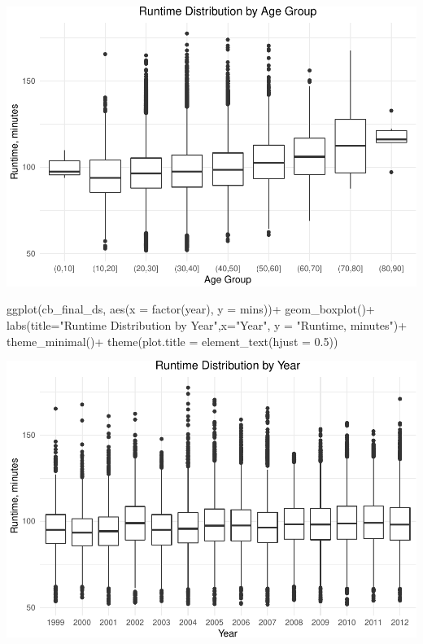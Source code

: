 \documentclass[
]{article}
\newenvironment{Shaded}{\begin{snugshade}}{\end{snugshade}}
\newcommand{\AttributeTok}[1]{\textcolor[rgb]{0.77,0.63,0.00}{#1}}
\newcommand{\FloatTok}[1]{\textcolor[rgb]{0.00,0.00,0.81}{#1}}
\newcommand{\FunctionTok}[1]{\textcolor[rgb]{0.00,0.00,0.00}{#1}}
\newcommand{\NormalTok}[1]{#1}
\newcommand{\SpecialCharTok}[1]{\textcolor[rgb]{0.00,0.00,0.00}{#1}}
\newcommand{\StringTok}[1]{\textcolor[rgb]{0.31,0.60,0.02}{#1}}
\begin{document}
\includegraphics{case_study02_SO02_files/figure-latex/analysis16-1}

\begin{Shaded}
\begin{Highlighting}[]
\FunctionTok{ggplot}\NormalTok{(cb\_final\_ds, }\FunctionTok{aes}\NormalTok{(}\AttributeTok{x =} \FunctionTok{factor}\NormalTok{(year), }\AttributeTok{y =}\NormalTok{ mins))}\SpecialCharTok{+}
  \FunctionTok{geom\_boxplot}\NormalTok{()}\SpecialCharTok{+}
  \FunctionTok{labs}\NormalTok{(}\AttributeTok{title=}\StringTok{"Runtime Distribution by Year"}\NormalTok{,}\AttributeTok{x=}\StringTok{"Year"}\NormalTok{, }\AttributeTok{y =} \StringTok{"Runtime, minutes"}\NormalTok{)}\SpecialCharTok{+}
  \FunctionTok{theme\_minimal}\NormalTok{()}\SpecialCharTok{+}
  \FunctionTok{theme}\NormalTok{(}\AttributeTok{plot.title =} \FunctionTok{element\_text}\NormalTok{(}\AttributeTok{hjust =} \FloatTok{0.5}\NormalTok{))}
\end{Highlighting}
\end{Shaded}

\includegraphics{case_study02_SO02_files/figure-latex/analysis14-1}
\end{document}
